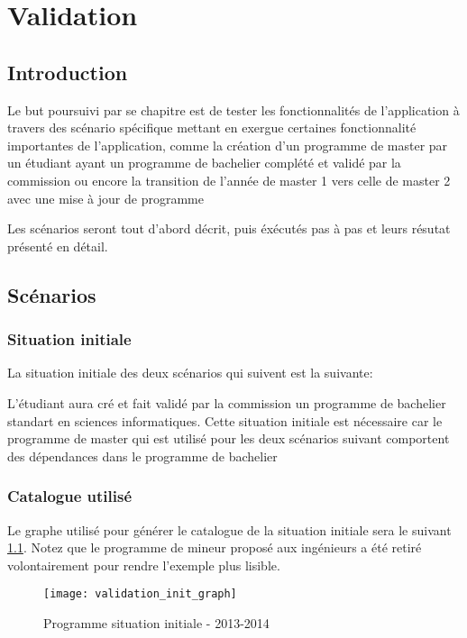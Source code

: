 \chapter{Validation}
\label{validation}
\section{Introduction}
\label{introduction_val}
Le but poursuivi par se chapitre est de tester les fonctionnalités de l'application à travers des scénario spécifique mettant en exergue certaines fonctionnalité importantes de l'application, comme la création d'un programme de master par un étudiant ayant un programme de bachelier complété et validé par la commission ou encore la transition de l'année de master 1 vers celle de master 2 avec une mise à jour de programme

Les scénarios seront tout d'abord décrit, puis éxécutés pas à pas et leurs résutat présenté en détail. 

\section{Scénarios}
\subsection{Situation initiale}
La situation initiale des deux scénarios qui suivent est la suivante:

L'étudiant aura cré et fait validé par la commission un programme de bachelier standart en sciences informatiques. Cette situation initiale est nécessaire car le programme de master qui est utilisé pour les deux scénarios suivant comportent des dépendances dans le programme de bachelier

\subsection{Catalogue utilisé}
Le graphe utilisé pour générer le catalogue de la situation initiale sera le suivant \ref{fig:situation_initiale}. Notez que le programme de mineur proposé aux ingénieurs a été retiré volontairement pour rendre l'exemple plus lisible.
\begin{figure}
\centering
\caption{Programme situation initiale - 2013-2014}
\label{fig:situation_initiale}
\texttt{[image: validation\_init\_graph]}
\end{figure}

